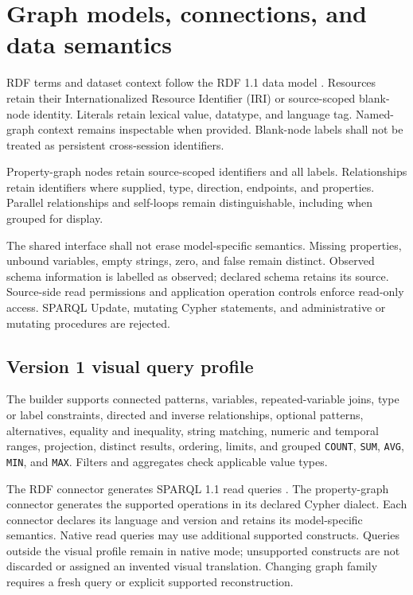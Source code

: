 \documentclass[11pt,a4paper]{article}
\begin{document}
\section{Graph models, connections, and data semantics}
RDF terms and dataset context follow the RDF 1.1 data model \citep{rdfconcepts}. Resources retain their Internationalized Resource Identifier (IRI) or source-scoped blank-node identity. Literals retain lexical value, datatype, and language tag. Named-graph context remains inspectable when provided. Blank-node labels shall not be treated as persistent cross-session identifiers.

Property-graph nodes retain source-scoped identifiers and all labels. Relationships retain identifiers where supplied, type, direction, endpoints, and properties. Parallel relationships and self-loops remain distinguishable, including when grouped for display.

The shared interface shall not erase model-specific semantics. Missing properties, unbound variables, empty strings, zero, and false remain distinct. Observed schema information is labelled as observed; declared schema retains its source. Source-side read permissions and application operation controls enforce read-only access. SPARQL Update, mutating Cypher statements, and administrative or mutating procedures are rejected.

\subsection{Version 1 visual query profile}\label{sec:profile}
The builder supports connected patterns, variables, repeated-variable joins, type or label constraints, directed and inverse relationships, optional patterns, alternatives, equality and inequality, string matching, numeric and temporal ranges, projection, distinct results, ordering, limits, and grouped \texttt{COUNT}, \texttt{SUM}, \texttt{AVG}, \texttt{MIN}, and \texttt{MAX}. Filters and aggregates check applicable value types.

The RDF connector generates SPARQL 1.1 read queries \citep{sparql}. The property-graph connector generates the supported operations in its declared Cypher dialect. Each connector declares its language and version and retains its model-specific semantics. Native read queries may use additional supported constructs. Queries outside the visual profile remain in native mode; unsupported constructs are not discarded or assigned an invented visual translation. Changing graph family requires a fresh query or explicit supported reconstruction.
\end{document}

